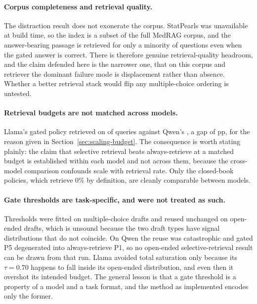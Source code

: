 \paragraph{Corpus completeness and retrieval quality.} The distraction result
does not exonerate the corpus. StatPearls was unavailable at build time, so
the index is a subset of the full MedRAG corpus, and the answer-bearing
passage is retrieved for only a minority of questions even when the gated
answer is correct. There is therefore genuine retrieval-quality headroom, and
the claim defended here is the narrower one, that on this corpus and retriever
the dominant failure mode is displacement rather than absence. Whether a
better retrieval stack would flip any multiple-choice ordering is untested.

\paragraph{Retrieval budgets are not matched across models.} Llama's gated
policy retrieved on \retPfiveMcq{} of queries against Qwen's
\retQwenPfiveMcq{}, a gap of \budgetGapMcq{}pp, for the reason given in
Section~\ref{sec:scaling-budget}. The consequence is worth stating plainly:
the claim that selective retrieval beats always-retrieve at a matched budget
is established within each model and not across them, because the cross-model
comparison confounds scale with retrieval rate. Only the closed-book policies,
which retrieve 0\% by definition, are cleanly comparable between models.

\paragraph{Gate thresholds are task-specific, and were not treated as such.}
Thresholds were fitted on multiple-choice drafts and reused unchanged on
open-ended drafts, which is unsound because the two draft types have signal
distributions that do not coincide. On Qwen the reuse was catastrophic and
gated P5 degenerated into always-retrieve P1, so no open-ended
selective-retrieval result can be drawn from that run. Llama avoided total
saturation only because its $\tau = 0.70$ happens to fall inside its
open-ended distribution, and even then it overshot its intended budget. The
general lesson is that a gate threshold is a property of a model and a task
format, and the method as implemented encodes only the former.

